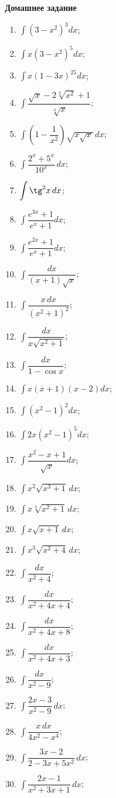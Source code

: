 \documentclass[12pt]{article}
\newcommand{\dint}{\displaystyle\int}
\begin{document}
	\begin{center}
		\large\bf Домашнее задание
	\end{center}
	
	\begin{enumerate}
		\item $\dint (3-x^2)^3 dx$;
		\item $\dint x(3-x^2)^5 dx$;
		\item $\dint x(1-3x)^{25} dx$;
		\item $\dint \dfrac{\sqrt{x}-2\sqrt[3]{x^2}+1}{\sqrt[4]{x}}$;
		\item $\dint \left(1-\dfrac{1}{x^2}\right)\sqrt{x\sqrt{x}}\,dx$;
		\item $\dint \dfrac{2^x+5^x}{10^x}\, dx$;
		\item $\dint \tg^2 x\, dx$;
		\item $\dint \dfrac{e^{3x}+1}{e^x+1} dx$;
		\item $\dint \dfrac{e^{2x}+1}{e^x+1} dx$;
		\item $\dint \dfrac{dx}{(x+1)\sqrt{x}}$;
		\item $\dint \dfrac{x\, dx}{(x^2+1)^2}$;
		\item $\dint \dfrac{dx}{x\sqrt{x^2+1}}$;
		\item $\dint \dfrac{dx}{1-\cos x}$;
		\item $\dint x(x+1)(x-2)dx$;
		\item $\dint (x^2-1)^2 dx$;
		\item $\dint 2x(x^2-1)^5 dx$;
		\item $\dint \dfrac{x^2-x+1}{\sqrt{x}}dx$;
		\item $\dint x^2\sqrt{x^3+1}\, dx$;
		\item $\dint x\sqrt[4]{x^2+1}\, dx$;
		\item $\dint x\sqrt{x+1}\,dx$;
		\item $\dint x^3\sqrt{x^2+4}\,dx$;
		\item $\dint \dfrac{dx}{x^2+4}$;
		\item $\dint \dfrac{dx}{x^2+4x+4}$;
		\item $\dint \dfrac{dx}{x^2+4x+8}$;
		\item $\dint \dfrac{dx}{x^2+4x+3}$;
		\item $\dint \dfrac{dx}{x^2-9}$;
		\item $\dint \dfrac{2x-3}{x^2-9}\,dx$;
		\item $\dint \dfrac{x\,dx}{4x^2-x^4}$;
		\item $\dint \dfrac{3x-2}{2-3x+5x^2}\,dx$;
		\item $\dint \dfrac{2x-1}{x^2+3x+1}\,dx$;

\end{enumerate}
\end{document}
